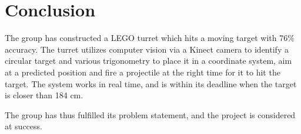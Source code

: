 \section{Conclusion}
The group has constructed a LEGO turret which hits a moving target with 76\% accuracy. The turret utilizes computer vision via a Kinect camera to identify a circular target and various trigonometry to place it in a coordinate system, aim at a predicted position and fire a projectile at the right time for it to hit the target. 
The system works in real time, and is within its deadline when the target is closer than 184 cm.

The group has thus fulfilled its problem statement, and the project is considered at success.